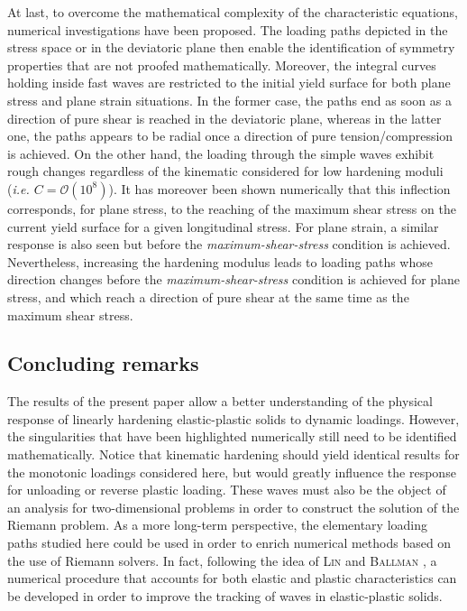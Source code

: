 At last, to overcome the mathematical complexity of the characteristic equations, numerical investigations have been proposed.
The loading paths depicted in the stress space or in the deviatoric plane then enable the identification of symmetry properties that are not proofed mathematically.
Moreover, the integral curves holding inside fast waves are restricted to the initial yield surface for both plane stress and plane strain situations.  
In the former case, the paths end as soon as a direction of pure shear is reached in the deviatoric plane, whereas in the latter one, the paths appears to be radial once  a direction of pure tension/compression is achieved.
On the other hand, the loading through the simple waves exhibit rough changes regardless of the kinematic considered for low hardening moduli (\textit{i.e. $C=\mathcal{O}(10^8)$}). 
It has moreover been shown numerically that this inflection corresponds, for plane stress, to the reaching of the maximum shear stress on the current yield surface for a given longitudinal stress.
For plane strain, a similar response is also seen but before the \textit{maximum-shear-stress} condition is achieved.
Nevertheless, increasing the hardening modulus leads to loading paths whose direction changes before the \textit{maximum-shear-stress} condition is achieved for plane stress, and which reach a direction of pure shear at the same time as the maximum shear stress.


\subsection{Concluding remarks}
\label{sec:concludingRemarks}

The results of the present paper allow a better understanding of the physical response of linearly hardening elastic-plastic solids to dynamic loadings.
However, the singularities that have been highlighted numerically still need to be identified mathematically.
Notice that kinematic hardening should yield identical results for the monotonic loadings considered here, but would greatly influence the response for unloading or reverse plastic loading.
  These waves must also be the object of an analysis for two-dimensional problems in order to construct the solution of the Riemann problem. 
As a more long-term perspective, the elementary loading paths studied here could be used in order to enrich numerical methods based on the use of Riemann solvers.
In fact, following the idea of \textsc{Lin} and \textsc{Ballman} \cite{Lin_et_Ballman}, a numerical procedure that accounts for both elastic and plastic characteristics can be developed in order to improve the tracking of waves in elastic-plastic solids.


